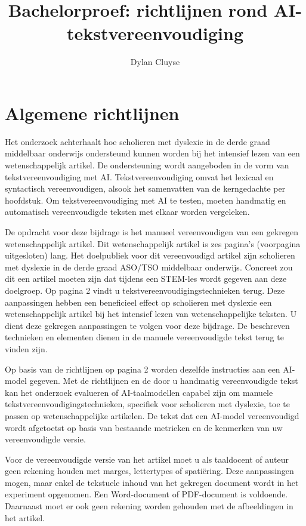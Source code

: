 \documentclass{report}
\title{Bachelorproef: richtlijnen rond AI-tekstvereenvoudiging}
\author{Dylan Cluyse}
\begin{document}
	\chapter{Algemene richtlijnen}
	
	Het onderzoek achterhaalt hoe scholieren met dyslexie in de derde graad middelbaar onderwijs ondersteund kunnen worden bij het intensief lezen van een wetenschappelijk artikel. De ondersteuning wordt aangeboden in de vorm van tekstvereenvoudiging met AI. Tekstvereenvoudiging omvat het lexicaal en syntactisch vereenvoudigen, alsook het samenvatten van de kerngedachte per hoofdstuk. Om tekstvereenvoudiging met AI te testen, moeten handmatig en automatisch vereenvoudigde teksten met elkaar worden vergeleken. 
	
	\medspace
	
	De opdracht voor deze bijdrage is het manueel vereenvoudigen van een gekregen wetenschappelijk artikel. Dit wetenschappelijk artikel is zes pagina's (voorpagina uitgesloten) lang. Het doelpubliek voor dit vereenvoudigd artikel zijn scholieren met dyslexie in de derde graad ASO/TSO middelbaar onderwijs. Concreet zou dit een artikel moeten zijn dat tijdens een STEM-les wordt gegeven aan deze doelgroep. Op pagina 2 vindt u tekstvereenvoudigingstechnieken terug. Deze aanpassingen hebben een beneficieel effect op scholieren met dyslexie een wetenschappelijk artikel bij het intensief lezen van wetenschappelijke teksten. U dient deze gekregen aanpassingen te volgen voor deze bijdrage. De beschreven technieken en elementen dienen in de manuele vereenvoudigde tekst terug te vinden zijn. 
	
	\medspace
	
	Op basis van de richtlijnen op pagina 2 worden dezelfde instructies aan een AI-model gegeven. Met de richtlijnen en de door u handmatig vereenvoudigde tekst kan het onderzoek evalueren of AI-taalmodellen capabel zijn om manuele tekstvereenvoudigingstechnieken, specifiek voor scholieren met dyslexie, toe te passen op wetenschappelijke artikelen. De tekst dat een AI-model vereenvoudigd wordt afgetoetst op basis van bestaande metrieken en de kenmerken van uw vereenvoudigde versie. %
	
	\medspace
	
	Voor de vereenvoudigde versie van het artikel moet u als taaldocent of auteur geen rekening houden met marges, lettertypes of spatiëring. Deze aanpassingen mogen, maar enkel de tekstuele inhoud van het gekregen document wordt in het experiment opgenomen. Een Word-document of PDF-document is voldoende. Daarnaast moet er ook geen rekening worden gehouden met de afbeeldingen in het artikel.  
	
\end{document}
